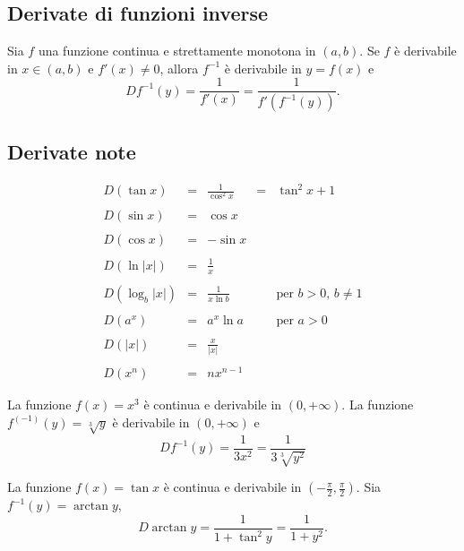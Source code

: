 \subsection{Derivate di funzioni inverse}
\begin{theorem}
    Sia $f$ una funzione continua e strettamente monotona in $(a,b)$. Se $f$ è derivabile in $x\in(a,b)$ e $f'(x)\neq 0$, allora $f^{-1}$ è derivabile in $y=f(x)$ e
    \begin{equation*}
        Df^{-1}(y)=\frac{1}{f'(x)}=\frac{1}{f'(f^{-1}(y))}.
    \end{equation*}
\end{theorem}

\subsection{Derivate note}
\begin{equation*}
    \begin{matrix}
        D(\tan x) &=& \frac{1}{\cos^2x} &=& \tan^2x+1\\\\
        D(\sin x) &=& \cos x\\\\
        D(\cos x) &=& -\sin x\\\\
        D(\ln{|x|}) &=& \frac{1}{x}\\\\
        D(\log_b{|x|}) &=& \frac{1}{x\ln b} && \text{per } b>0,\, b\neq 1\\\\
        D(a^x) &=& a^x\ln a && \text{per } a>0\\\\
        D(|x|) &=& \frac{x}{|x|}\\\\
        D(x^n) &=& nx^{n-1}
    \end{matrix}
\end{equation*}

\begin{example}
    La funzione $f(x)=x^3$ è continua e derivabile in $(0,+\infty)$. La funzione $f^{(-1)}(y)=\sqrt[3]{y}$ è derivabile in $(0,+\infty)$ e 
    \begin{equation*}
        Df^{-1}(y)=\frac{1}{3x^2}=\frac{1}{3\sqrt[3]{y^2}}
    \end{equation*}
\end{example}

\begin{example}
    La funzione $f(x)=\tan x$ è continua e derivabile in $\left(-\frac{\pi}{2},\frac{\pi}{2}\right)$. Sia $f^{-1}(y)=\arctan y$,
    \begin{equation*}
        D\arctan y=\frac{1}{1+\tan^2 y}=\frac{1}{1+y^2}.
    \end{equation*}
\end{example}


